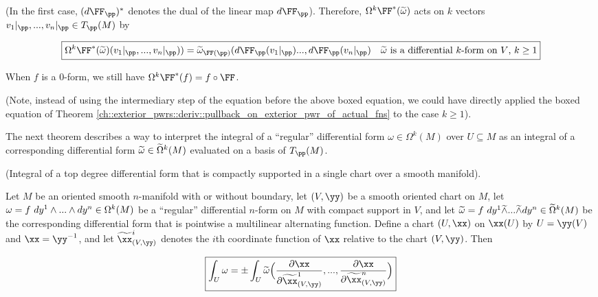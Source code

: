 \begin{deriv}
    (In the first case, $(d\FF_\pp)^*$ denotes the dual of the linear map $d\FF_\pp$). Therefore, $\Omega^k \FF^*(\tomega)$ acts on $k$ vectors $v_1|_\pp, ..., v_n|_\pp \in T_\pp(M)$ by
    
    \begin{align*}
        \boxed
        {
            \Omega^k \FF^*(\tomega)(v_1|_\pp, ..., v_n|_\pp)) = \tomega_{\FF(\pp)}(d\FF_\pp(v_1|_\pp) ..., d\FF_\pp(v_n|_\pp) \quad \text{$\tomega$ is a differential $k$-form on $V$, $k \geq 1$}
        }
    \end{align*}
    
    When $f$ is a $0$-form, we still have $\Omega^k \FF^*(f) = f \circ \FF$.
    
    (Note, instead of using the intermediary step of the equation before the above boxed equation, we could have directly applied the boxed equation of Theorem \ref{ch::exterior_pwrs::deriv::pullback_on_exterior_pwr_of_actual_fns} to the case $k \geq 1$).
\end{deriv}

The next theorem describes a way to interpret the integral of a ``regular'' differential form $\omega \in \Omega^k(M)$ over $U \subseteq M$ as an integral of a corresponding differential form $\widetilde{\omega} \in \widetilde{\Omega}^k(M)$ evaluated on a basis of $T_\pp(M)$.

\begin{theorem}
\label{ch::diff_forms::thm::integral_of_diff_form_actual_function_single_chart}
     (Integral of a top degree differential form that is compactly supported in a single chart over a smooth manifold).
    
    Let $M$ be an oriented smooth $n$-manifold with or without boundary, let $(V, \yy)$ be a smooth oriented chart on $M$, let $\omega = f \text{ } dy^1 \wedge ... \wedge dy^n \in \Omega^k(M)$ be a ``regular'' differential $n$-form on $M$ with compact support in $V$, and let $\widetilde{\omega} = f \text{ } dy^1 \widetilde{\wedge} ... \widetilde{\wedge} dy^n \in \widetilde{\Omega}^k(M)$ be the corresponding differential form that is pointwise a multilinear alternating function. Define a chart $(U, \xx)$ on $\xx(U)$ by $U = \yy(V)$ and $\xx = \yy^{-1}$, and let $\tx_{(V, \yy)}^i$ denotes the $i$th coordinate function of $\xx$ relative to the chart $(V, \yy)$. Then
    
    \begin{align*}
        \boxed
        {
            \int_U \omega = \pm \int_U \tomega \Big( \frac{\pd \xx}{\pd \tx_{(V, \yy)}^1}, ..., \frac{\pd \xx}{\pd \tx_{(V, \yy)}^n} \Big)
        }
    \end{align*}
\end{theorem}

